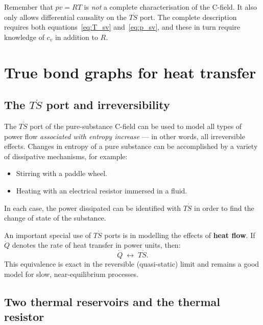 \begin{warningbox}
  Remember that $pv = RT$ is \emph{not} a complete characterisation of the
  C-field.  It also only allows differential causality on the $T\dot{S}$
  port.  The complete description requires both equations~\eqref{eq:T_sv}
  and~\eqref{eq:p_sv}, and these in turn require knowledge of $c_{v}$ in
  addition to $R$.
\end{warningbox}


\section{True bond graphs for heat transfer}
\label{sec:heat_transfer}

\subsection{The \texorpdfstring{$T\dot{S}$}{TS-dot} port and irreversibility}
\label{ssec:Sdot_port}

The $T\dot{S}$ port of the pure-substance C-field can be used to model
all types of power flow \emph{associated with entropy increase} --- in other
words, all irreversible effects.  Changes in entropy of a pure substance can
be accomplished by a variety of dissipative mechanisms, for example:
\begin{itemize}[leftmargin=2em,itemsep=2pt]
  \item Stirring with a paddle wheel.
  \item Heating with an electrical resistor immersed in a fluid.
\end{itemize}
In each case, the power dissipated can be identified with $T\dot{S}$ in
order to find the change of state of the substance.

An important special use of $T\dot{S}$ ports is in modelling the effects
of \textbf{heat flow}.  If $\dot{Q}$ denotes the rate of heat transfer in
power units, then:
\begin{equation}
  \dot{Q} \;\leftrightarrow\; T\dot{S}.
  \label{eq:heat_power}
\end{equation}
This equivalence is exact in the reversible (quasi-static) limit and
remains a good model for slow, near-equilibrium processes.


\subsection{Two thermal reservoirs and the thermal resistor}
\label{ssec:thermal_resistor}

